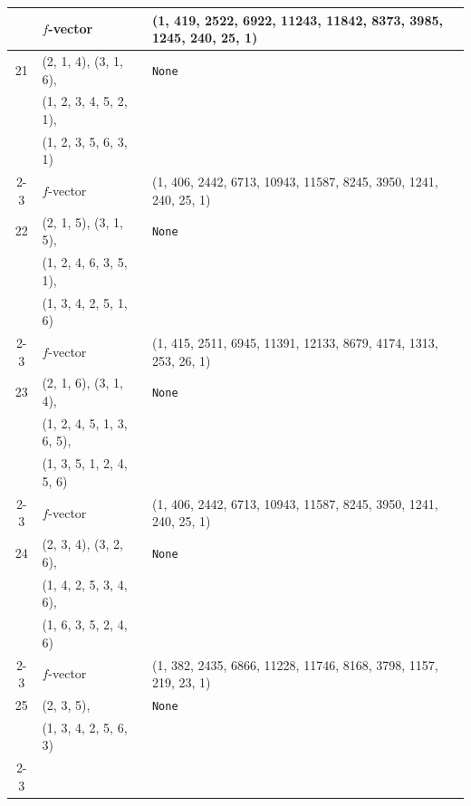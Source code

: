 \documentclass[10pt]{amsart}
\numberwithin{equation}{section}
\theoremstyle{plain}
\theoremstyle{definition}
\theoremstyle{remark}
\begin{document}
{\begin{longtable}{c|l|l}
		& $f$-vector & {(1, 419, 2522, 6922, 11243, 11842, 8373, 3985, 1245, 240, 25, 1)} \\
		\midrule
		
		21 & (2, 1, 4), (3, 1, 6), & \texttt{None} \\
		& (1, 2, 3, 4, 5, 2, 1), &  \\
		& (1, 2, 3, 5, 6, 3, 1) &  \\ \cline{2-3}
		
		& $f$-vector & {(1, 406, 2442, 6713, 10943, 11587, 8245, 3950, 1241, 240, 25, 1)} \\
		\midrule
		
		22 & (2, 1, 5), (3, 1, 5), & \texttt{None} \\
		& (1, 2, 4, 6, 3, 5, 1), &  \\
		& (1, 3, 4, 2, 5, 1, 6) &  \\ \cline{2-3}
		
		& $f$-vector & {(1, 415, 2511, 6945, 11391, 12133, 8679, 4174, 1313, 253, 26, 1)} \\
		\midrule
		
		23 & (2, 1, 6), (3, 1, 4), & \texttt{None} \\
		& (1, 2, 4, 5, 1, 3, 6, 5), &  \\
		& (1, 3, 5, 1, 2, 4, 5, 6) &  \\ \cline{2-3}
		
		& $f$-vector & {(1, 406, 2442, 6713, 10943, 11587, 8245, 3950, 1241, 240, 25, 1)} \\
		\midrule
		
		24 & (2, 3, 4), (3, 2, 6), & \texttt{None} \\
		& (1, 4, 2, 5, 3, 4, 6), &  \\
		& (1, 6, 3, 5, 2, 4, 6) &  \\ \cline{2-3}
		
		& $f$-vector & {(1, 382, 2435, 6866, 11228, 11746, 8168, 3798, 1157, 219, 23, 1)} \\
		\midrule
		
		25 & (2, 3, 5), & \texttt{None} \\
		& (1, 3, 4, 2, 5, 6, 3) &  \\ \cline{2-3}
		

\end{longtable}}
\end{document}
